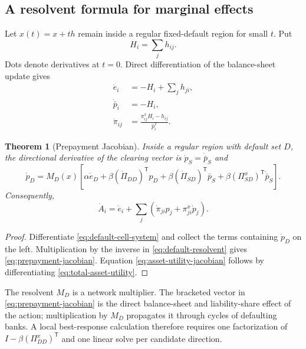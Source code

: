 \documentclass[11pt]{article}
\newtheorem{theorem}{Theorem}[section]
\theoremstyle{definition}
\theoremstyle{remark}
\newcommand{\pbar}{\bar p}
\begin{document}
\subsection{A resolvent formula for marginal effects}

Let $x(t)=x+th$ remain inside a regular fixed-default region for small $t$.
Put
\begin{equation}
  H_i=\sum_jh_{ij}.
\end{equation}
Dots denote derivatives at $t=0$.  Direct differentiation of the
balance-sheet update gives
\begin{align}
  \dot e_i&=-H_i+\sum_jh_{ji},
      \label{eq:asset-direction}\\
  \dot{\pbar}_i&=-H_i,
      \label{eq:liability-direction}\\
  \dot\pi_{ij}
    &=\frac{\pi_{ij}^xH_i-h_{ij}}{\pbar_i^x}.
      \label{eq:relative-liability-direction}
\end{align}

\begin{theorem}[Prepayment Jacobian]\label{thm:prepayment-jacobian}
Inside a regular region with default set $D$, the directional derivative of
the clearing vector is $\dot p_S=\dot{\pbar}_S$ and
\begin{equation}\label{eq:prepayment-jacobian}
  \dot p_D=M_D(x)\left[
    \alpha\dot e_D
    +\beta(\dot\Pi_{DD})^{\mathsf T}p_D
    +\beta(\dot\Pi_{SD})^{\mathsf T}\pbar_S
    +\beta(\Pi_{SD}^x)^{\mathsf T}\dot{\pbar}_S
  \right].
\end{equation}
Consequently,
\begin{equation}\label{eq:asset-utility-jacobian}
  \dot A_i
  =\dot e_i+
   \sum_j\left(\dot\pi_{ji}p_j+\pi_{ji}^x\dot p_j\right).
\end{equation}
\end{theorem}

\begin{proof}
Differentiate \eqref{eq:default-cell-system} and collect the terms containing
$\dot p_D$ on the left.  Multiplication by the inverse in
\eqref{eq:default-resolvent} gives
\eqref{eq:prepayment-jacobian}.  Equation
\eqref{eq:asset-utility-jacobian} follows by differentiating
\eqref{eq:total-asset-utility}.
\end{proof}

The resolvent $M_D$ is a network multiplier.  The bracketed vector in
\eqref{eq:prepayment-jacobian} is the direct balance-sheet and liability-share
effect of the action; multiplication by $M_D$ propagates it through cycles of
defaulting banks.  A local best-response calculation therefore requires one
factorization of $I-\beta(\Pi_{DD}^x)^{\mathsf T}$ and one linear solve per
candidate direction.
\end{document}
